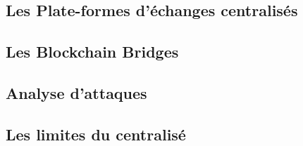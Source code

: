 \subsection{Les Plate-formes d'échanges centralisés}


\subsection{Les Blockchain Bridges}


\subsection{Analyse d'attaques}


\subsection{Les limites du centralisé}

